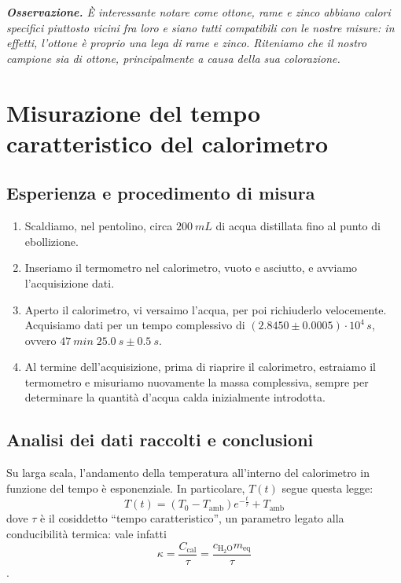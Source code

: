 \documentclass{article}
\newcommand*{\acqua}{{\text{H}_2\text{O}}}
\begin{document}
\emph{
    \textbf{Osservazione.}
    È interessante notare come ottone, rame e zinco abbiano calori specifici piuttosto vicini
    fra loro e siano tutti compatibili con le nostre misure: in effetti, l'ottone è proprio
    una lega di rame e zinco. Riteniamo che il nostro campione sia di ottone, principalmente
    a causa della sua colorazione.
}

\section{Misurazione del tempo caratteristico del calorimetro}

\subsection{Esperienza e procedimento di misura}

\begin{enumerate}
    \item
        Scaldiamo, nel pentolino, circa $\qty{200}{mL}$ di acqua distillata
        fino al punto di ebollizione.
    \item
        Inseriamo il termometro nel calorimetro, vuoto e asciutto, e avviamo
        l'acquisizione dati.
    \item
        Aperto il calorimetro, vi versaimo l'acqua, per poi richiuderlo velocemente.
        Acquisiamo dati per un tempo complessivo di
        $\left(2.8450\pm0.0005\right)\cdot10^4\,\unit{s}$, ovvero
        $\qty{47}{min}\;\qty{25.0}{s}\pm\qty{0.5}{s}$.
    \item
        Al termine dell'acquisizione, prima di riaprire il calorimetro, estraiamo
        il termometro e misuriamo nuovamente la massa complessiva, sempre per
        determinare la quantità d'acqua calda inizialmente introdotta.
\end{enumerate}

\subsection{Analisi dei dati raccolti e conclusioni}
Su larga scala, l'andamento della temperatura all'interno del calorimetro
in funzione del tempo è esponenziale. In particolare, $T(t)$ segue questa
legge:
\[
    T(t) = (T_0 - T_\text{amb}) e^{-\frac{t}{\tau}} + T_\text{amb}
\]
dove $\tau$ è il cosiddetto “tempo caratteristico”, un parametro legato
alla conducibilità termica: vale infatti
\[\kappa = \frac{C_\text{cal}}{\tau} = \frac{c_\acqua m_\text{eq}}{\tau}\].
\end{document}

